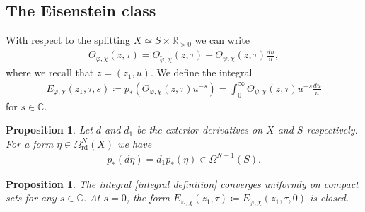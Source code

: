 \documentclass[a4paper,11pt]{amsart} %
\newcommand{\8}{\infty}
\newcommand{\R}{\mathbb{R}}
\newcommand{\C}{\mathbb{C}}
\newcommand{\etatil}{\widetilde{\eta}}
\newcommand{\vptil}{\widetilde{\varphi}}
\newcommand{\rd}{\textrm{rd}}
\theoremstyle{mytheoremstyle}
\newtheorem{prop}[thm]{Proposition}
\theoremstyle{remark}
\numberwithin{equation}{section}
\begin{document}
\subsection{The Eisenstein class} \label{sec:eisensteinclass}

With respect to the splitting $X \simeq S \times \R_{>0}$ we can write
\begin{align}
    \Theta_{\varphi, \chi}(z,\tau) =\Theta_{\vptil, \chi}(z,\tau)+\Theta_{\psi, \chi}(z,\tau)  \frac{du}{u},
\end{align}
where we recall that $z=(z_1,u)$. We define the integral 
\begin{align} \label{integral definition}
E_{\varphi, \chi}(z_1,\tau,s) \coloneqq p_\ast \left (\Theta_{\varphi, \chi}(z,\tau) u^{-s}\right )= \int_{0}^\8 \Theta_{\psi, \chi}(z,\tau) u^{-s} \frac{du}{u}
\end{align}
for $s \in \C$.
\begin{prop} \cite[Proposition.6.14.1]{botu} \label{dpushforward} Let $d$ and $d_1$ be the exterior derivatives on $X$ and $S$ respectively. For a form $\eta \in \Omega_{\rd}^N(X)$ we have
\begin{align}
p_\ast( d \eta)=d_1 p_\ast (\eta) \in \Omega^{N-1}(S).
\end{align}
\end{prop}
%

\begin{prop} The integral \eqref{integral definition} converges uniformly on compact sets for any $s \in \C$. At $s=0$, the form $E_{\varphi, \chi}(z_1,\tau) \coloneqq E_{\varphi, \chi}(z_1,\tau,0)$ is closed.
\end{prop}
\end{document}
